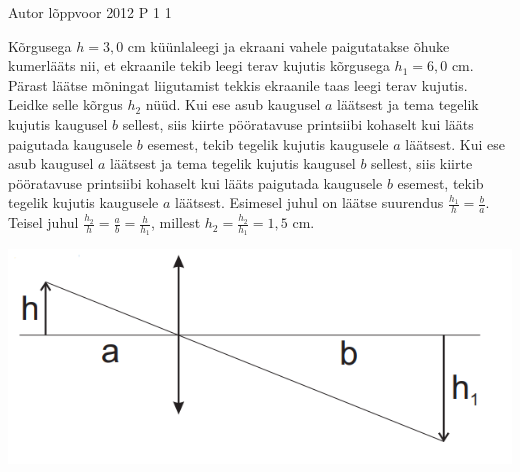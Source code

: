 {Autor} %
{lõppvoor} %
{2012} %
{P 1} %
{1} %
{
\ifStatement
Kõrgusega $h = 3,0$ cm küünlaleegi ja ekraani vahele paigutatakse õhuke kumerlääts nii, et ekraanile tekib leegi terav kujutis kõrgusega $h_1 = 6,0$ cm. Pärast läätse mõningat liigutamist tekkis ekraanile taas leegi terav kujutis. Leidke selle kõrgus $h_2$ nüüd.
\fi
\ifHint
Kui ese asub kaugusel $a$ läätsest ja tema tegelik kujutis kaugusel $b$ sellest, siis kiirte pööratavuse printsiibi kohaselt kui lääts paigutada kaugusele $b$ esemest, tekib tegelik kujutis kaugusele $a$ läätsest.
\fi
\ifSolution
Kui ese asub kaugusel $a$ läätsest ja tema tegelik kujutis kaugusel $b$ sellest, siis kiirte pööratavuse printsiibi kohaselt kui lääts paigutada kaugusele $b$ esemest, tekib tegelik kujutis kaugusele $a$ läätsest. Esimesel juhul on läätse suurendus $\frac{h_1}{h}= \frac{b}{a}$. Teisel juhul $\frac{h_2}{h}= \frac{a}{b} = \frac{h}{h_1}$, millest $h_2 = \frac{h_2}{h_1} = 1,5$ cm.
\begin{center}
	\includegraphics[width=0.5\linewidth]{2012-v3p-01-lah.PNG}
\end{center}
\fi
}